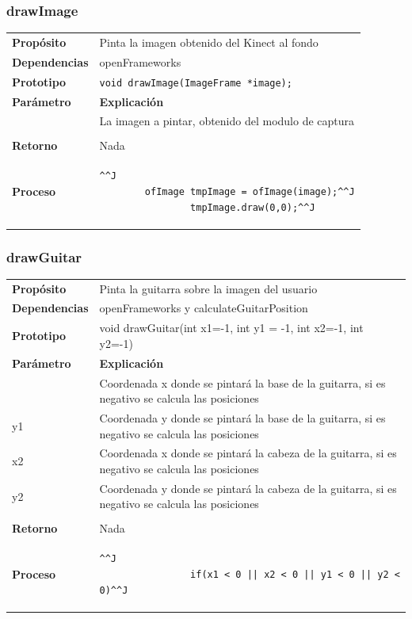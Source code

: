 \documentclass[a4paper,10pt]{article}
\begin{document}
\subsubsection{drawImage}
\begin{tabularx}{\textwidth}{p{25mm} X}
        \textbf{Propósito} & Pinta la imagen obtenido del Kinect al fondo\\
        \textbf{Dependencias} & openFrameworks \\
        \textbf{Prototipo} & \lstinline{void drawImage(ImageFrame *image);}\\
        \textbf{Parámetro} & \textbf{Explicación} \\
        \begin{tabular}{p{2cm} l}
               image & La imagen a pintar, obtenido del modulo de captura\\
        \end{tabular}\\

        \textbf{Retorno} & Nada\\
        \textbf{Proceso} & 
        \begin{lstlisting}^^J
        ofImage tmpImage = ofImage(image);^^J
                tmpImage.draw(0,0);^^J
        \end{lstlisting}

\end{tabularx}
\subsubsection{drawGuitar}
\begin{tabularx}{\textwidth}{p{25mm} X}
        \textbf{Propósito} & Pinta la guitarra sobre la imagen del usuario\\
        \textbf{Dependencias} & openFrameworks y calculateGuitarPosition\\
        \textbf{Prototipo} & void drawGuitar(int x1=-1, int y1 = -1, int x2=-1, int y2=-1)\\
        \textbf{Parámetro} & \textbf{Explicación} \\
        \begin{tabular}{p{2cm} l}
                x1 & Coordenada x donde se pintará la base de la guitarra, si es negativo se calcula las posiciones\\ 
                y1 & Coordenada y donde se pintará la base de la guitarra, si es negativo se calcula las posiciones\\ 
                x2 & Coordenada x donde se pintará la cabeza de la guitarra, si es negativo se calcula las posiciones\\ 
                y2 & Coordenada y donde se pintará la cabeza de la guitarra, si es negativo se calcula las posiciones\\ 
        \end{tabular}\\

        \textbf{Retorno} & Nada \\
        \textbf{Proceso} & 
        \begin{lstlisting}^^J
                if(x1 < 0 || x2 < 0 || y1 < 0 || y2 < 0)^^J
        \end{lstlisting}
\end{tabularx}
\end{document}
